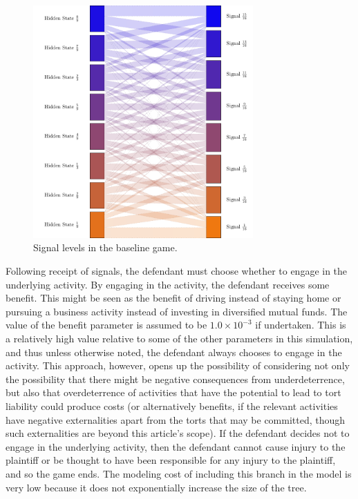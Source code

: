 \documentclass{article}
\begin{document}
\begin{figure}[t]
  \centering
  \includegraphics[width=0.75\textwidth,height=0.5\textheight]{../Figures/signals_levels.pdf}
  \caption{Signal levels in the baseline game.}
  \label{fig:signals_levels}
\end{figure}

Following receipt of signals, the defendant must choose whether to engage in the underlying activity. By engaging in the activity, the defendant receives some benefit. This might be seen as the benefit of driving instead of staying home or pursuing a business activity instead of investing in diversified mutual funds. The value of the benefit parameter is assumed to be $1.0 \times 10^{-3}$ if undertaken. This is a relatively high value relative to some of the other parameters in this simulation, and thus unless otherwise noted, the defendant always chooses to engage in the activity. This approach, however, opens up the possibility of considering not only the possibility that there might be negative consequences from underdeterrence, but also that overdeterrence of activities that have the potential to lead to tort liability could produce costs (or alternatively benefits, if the relevant activities have negative externalities apart from the torts that may be committed, though such externalities are beyond this article's scope). If the defendant decides not to engage in the underlying activity, then the defendant cannot cause injury to the plaintiff or be thought to have been responsible for any injury to the plaintiff, and so the game ends. The modeling cost of including this branch in the model is very low because it does not exponentially increase the size of the tree.
\end{document}
